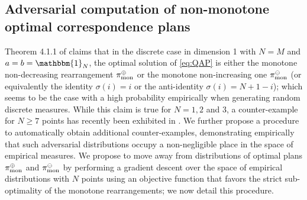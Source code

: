             \subsection{Adversarial computation of non-monotone optimal correspondence plans}
            \label{subsec:quadra1D_adversarial}
            Theorem 4.1.1 of \cite{vayer2020contribution} claims that in the discrete case in dimension 1 with $N=M$ and $a=b=\mathbbm{1}_N$, the optimal solution of \cref{eq:QAP} is either the monotone non-decreasing rearrangement $\pi_\text{mon}^\oplus$ or the monotone non-increasing one $\pi_\text{mon}^\ominus$ (or equivalently the identity $\sigma(i)=i$ or the anti-identity $\sigma(i)=N+1-i$); which seems to be the case with a high probability empirically when generating random discrete measures.
            While this claim is true for $N=1,2$ and $3$,
            a counter-example for $N\geq 7$ points has recently been exhibited in \cite{beinert2022assignment}. We further propose a procedure to automatically obtain additional counter-examples, demonstrating empirically that such adversarial distributions occupy a non-negligible place in the space of empirical measures.
            We propose to move away from distributions of optimal plans $\pi_\text{mon}^\oplus$ and $\pi_\text{mon}^\ominus$ by performing a gradient descent over the space of empirical distributions with $N$ points using an objective function that favors the strict sub-optimality of the monotone rearrangements; we now detail this procedure.

